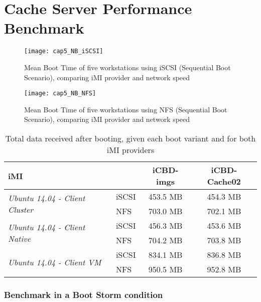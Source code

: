 \section{Cache Server Performance Benchmark}
\label{sub:eval_cache_bench}

\begin{figure}[htbp]
	\centering
	\texttt{[image: cap5\_NB\_iSCSI]}
	\caption{Mean Boot Time of five workstations using iSCSI (Sequential Boot Scenario), comparing iMI provider and network speed}
	\label{fig:boot_iscsi}
\end{figure}

\begin{figure}[htbp]
	\centering
	\texttt{[image: cap5\_NB\_NFS]}
	\caption{Mean Boot Time of five workstations using NFS (Sequential Boot Scenario), comparing iMI provider and network speed}
	\label{fig:boot_nfs}
\end{figure}

\begin{table}[]
\centering
\begin{tabular}{llcc}
\textbf{iMI} &  & \textbf{iCBD-imgs} & \textbf{iCBD-Cache02} \\ \hline
\multirow{2}{*}{\textit{Ubuntu 14.04 - Client Cluster}} & iSCSI & 453.5 MB & 454.3 MB \\
 & NFS & 703.0 MB & 702.1 MB \\ \hline
\multirow{2}{*}{\textit{Ubuntu 14.04 - Client Native}} & iSCSI & 456.3 MB & 453.6 MB \\
 & NFS & 704.2 MB & 703.8 MB \\ \hline
\multirow{2}{*}{\textit{Ubuntu 14.04 - Client VM}} & iSCSI & 834.1 MB & 836.8 MB \\
 & NFS & 950.5 MB & 952.8 MB
\end{tabular}
\caption{Total data received after booting, given each boot variant and for both iMI providers}
\label{tab:boot_totaldata}
\end{table}

\subsubsection{Benchmark in a Boot Storm condition}
\label{susub:eval_cache_bootstorm}

